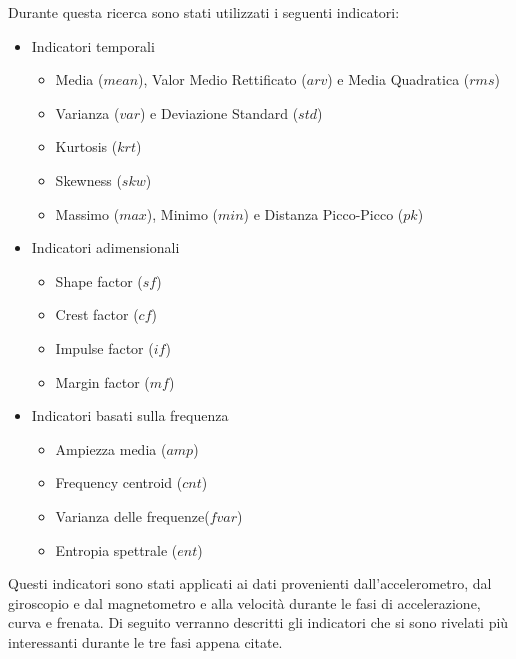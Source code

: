 \documentclass[class=article]{standalone}
\begin{document}
	Durante questa ricerca sono stati utilizzati i seguenti indicatori:
	\begin{itemize}
		\item Indicatori temporali
		\begin{itemize}
			\item Media (\(mean\)), Valor Medio Rettificato (\(arv\)) e Media Quadratica (\(rms\))
			\item Varianza (\(var\)) e Deviazione Standard (\(std\))
			\item Kurtosis (\(krt\))
			\item Skewness (\(skw\))
			\item Massimo (\(max\)), Minimo (\(min\)) e Distanza Picco-Picco (\(pk\))
		\end{itemize}
		\item Indicatori adimensionali
		\begin{itemize}
			\item Shape factor (\(sf\))
			\item Crest factor (\(cf\))
			\item Impulse factor (\(if\))
			\item Margin factor (\(mf\))
		\end{itemize}
		\item Indicatori basati sulla frequenza
		\begin{itemize}
			\item Ampiezza media (\(amp\))
			\item Frequency centroid (\(cnt\))
			\item Varianza delle frequenze(\(fvar\))
			\item Entropia spettrale (\(ent\))
		\end{itemize}
	\end{itemize}
	
	
	Questi indicatori sono stati applicati ai dati provenienti dall'accelerometro, dal giroscopio e dal magnetometro e alla velocità durante le fasi di accelerazione, curva e frenata. Di seguito verranno descritti gli indicatori che si sono rivelati più interessanti durante le tre fasi appena citate.
	
\end{document}
